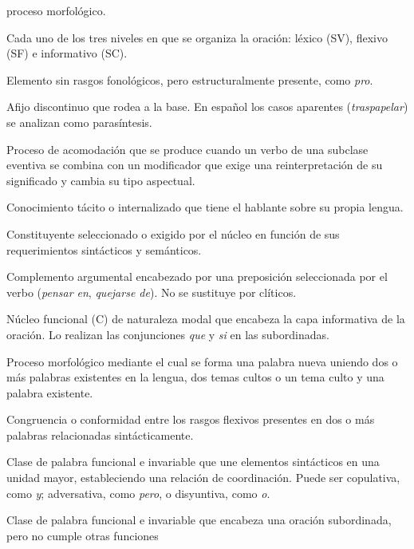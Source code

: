 \begin{glosariogeneral}
        proceso morfológico.
  \item[Capa oracional:] Cada uno de los tres niveles en que se organiza la
        oración: léxico (SV), flexivo (SF) e informativo (SC).
  \item[Categoría vacía:] Elemento sin rasgos fonológicos, pero
        estructuralmente presente, como \textit{pro}.
  \item[Circunfijo:] Afijo discontinuo que rodea a la base. En español los
        casos aparentes (\textit{traspapelar}) se analizan como parasíntesis.
  \item[Coerción:] Proceso de acomodación que se produce cuando un verbo de una
        subclase eventiva se combina con un modificador que exige una
        reinterpretación de su significado y cambia su tipo aspectual.
  \item[Competencia:] Conocimiento tácito o internalizado que tiene el hablante
        sobre su propia lengua.
  \item[Complemento:] Constituyente seleccionado o exigido por el núcleo en
        función de sus requerimientos sintácticos y semánticos.
  \item[Complemento de régimen:] Complemento argumental encabezado por una
        preposición seleccionada por el verbo (\textit{pensar en},
        \textit{quejarse de}). No se sustituye por clíticos.
  \item[Complementante:] Núcleo funcional (C) de naturaleza modal que encabeza
        la capa informativa de la oración. Lo realizan las conjunciones
        \textit{que} y \textit{si} en las subordinadas.
  \item[Composición:] Proceso morfológico mediante el cual se forma una palabra
        nueva uniendo dos o más palabras existentes en la lengua, dos temas
        cultos o un tema culto y una palabra existente.
  \item[Concordancia:] Congruencia o conformidad entre los rasgos flexivos
        presentes en dos o más palabras relacionadas sintácticamente.
  \item[Conjunción coordinante:] Clase de palabra funcional e invariable que une
        elementos sintácticos en una unidad mayor, estableciendo una relación de
        coordinación. Puede ser copulativa, como \textit{y}; adversativa, como
        \textit{pero}, o disyuntiva, como \textit{o}.
  \item[Conjunción subordinante:] Clase de palabra funcional e invariable que
        encabeza una oración subordinada, pero no cumple otras funciones

\end{glosariogeneral}
